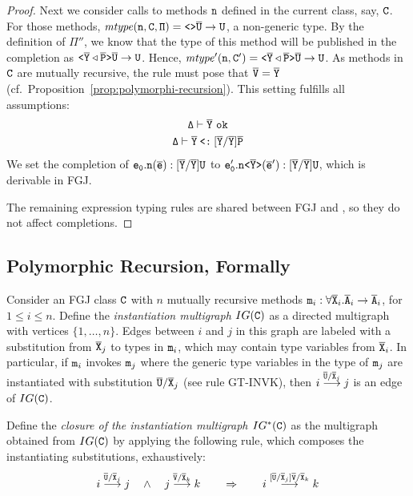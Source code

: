 \begin{proof}
    Next we consider calls to methods ${\tt n}$ defined in the current class, say, ${\tt C}$. For those methods,
    $\mathit{mtype} ({\tt n}, {\tt C}, {\tt \Pi}) = \mathtt{ \texttt{<}  \texttt{>} } \overline{\tt U} \to {\tt U}$, a non-generic
    type. By the definition of $\mathtt{\Pi''}$, we know that the type of this method will be
    published in the completion as $\mathtt{ \texttt{<} \overline{\tt Y} \triangleleft  \overline{\tt P} \texttt{>} } \overline{\tt U} \to {\tt U}$. Hence, $\mathit{mtype}' ({\tt n}, {\tt C}') = \mathtt{ \texttt{<} \overline{\tt Y} \triangleleft  \overline{\tt P} \texttt{>} } \overline{\tt U}
    \to {\tt U}$. As methods in ${\tt C}$ are mutually recursive, the rule must pose that $\overline{\tt V} = \overline{\tt Y}$ (cf.\
    Proposition~\ref{prop:polymorphi-recursion}). This setting fulfills all assumptions:
    \begin{gather}
      \label{eq:11}
      \mathtt{\Delta \vdash \overline{\tt Y} \ \texttt{ok} } \\
      \mathtt{\Delta \vdash \overline{\tt Y} \mathbin{\texttt{<:}}  [\overline{\tt Y}/\overline{\tt Y}]\overline{\tt P} }       
    \end{gather}
    We set the completion of
    $\mathtt{e_0.{\tt n}(\overline{\tt e}) : [\overline{\tt Y}/\overline{\tt Y}]U }$ to
    $\mathtt{e_0'.\mathtt{n \texttt{<} \overline{\tt Y} \texttt{>} }(\overline{\tt e}') : [\overline{\tt Y}/\overline{\tt Y}]U }$, which is derivable in FGJ.

    The remaining expression typing rules are shared between FGJ and \TFGJ, so they do not
    affect completions.
\end{proof}

\subsection{Polymorphic Recursion, Formally}
\label{sec:polym-recurs-form}

Consider an FGJ class ${\tt C}$ with $n$ mutually recursive methods ${\tt m}_i :
\forall\overline{\tt X}_i. \overline{\tt A}_i \to \overline{\tt A}_i$, for $1\le i\le n$. Define the \emph{instantiation
  multigraph $IG({\tt C})$} as a directed multigraph with vertices $\{1,
\dots, n\}$.
Edges between $i$ and $j$ in this graph are labeled with a
substitution from $\overline{\tt X}_j$ to types in ${\tt m}_i$, which may contain
type variables from $\overline{\tt X}_i$.
In particular, if ${\tt m}_i$ invokes ${\tt m}_j$ where the generic type variables in
the type of ${\tt m}_j$ are instantiated with substitution
$\overline{\tt U}/\overline{\tt X}_j$ (see rule GT-INVK), then 
$
i \stackrel{\overline{\tt U}/\overline{\tt X}_j}{\longrightarrow} j
$
is an edge of $IG ({\tt C})$.

Define the \emph{closure of the instantiation multigraph $IG^*({\tt C})$} as the multigraph
obtained from $IG({\tt C})$ by applying the following rule, which
composes the instantiating substitutions, exhaustively:
\begin{gather}\label{eq:1}
  i \stackrel{\overline{\tt U}/\overline{\tt X}_j}{\longrightarrow} j
  \quad\wedge\quad
  j \stackrel{\overline{\tt V}/\overline{\tt X}_k}{\longrightarrow} k
  \qquad\Rightarrow\qquad
  i \stackrel{[\overline{\tt U}/\overline{\tt X}_j]\overline{\tt V}/\overline{\tt X}_k}{\longrightarrow} k
\end{gather}

